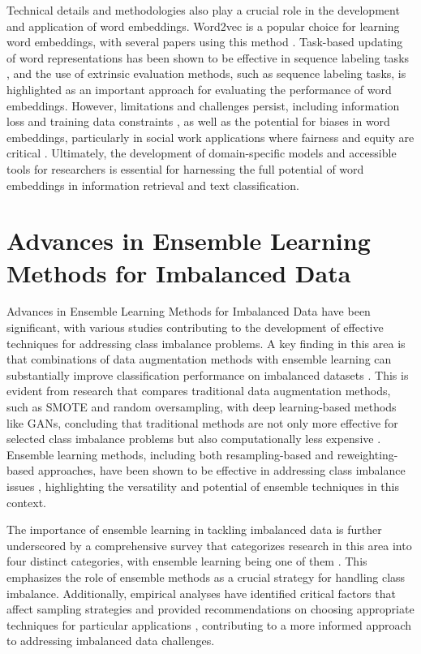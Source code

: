 \documentclass[conference]{IEEEtran}
\begin{document}
Technical details and methodologies also play a crucial role in the development and application of word embeddings. Word2vec is a popular choice for learning word embeddings, with several papers using this method \cite{towardWordEmbedding, utilityGeneralSpecific}. Task-based updating of word representations has been shown to be effective in sequence labeling tasks \cite{bigDataSmallData}, and the use of extrinsic evaluation methods, such as sequence labeling tasks, is highlighted as an important approach for evaluating the performance of word embeddings. However, limitations and challenges persist, including information loss and training data constraints \cite{primerWordEmbeddings}, as well as the potential for biases in word embeddings, particularly in social work applications where fairness and equity are critical \cite{primerWordEmbeddings}. Ultimately, the development of domain-specific models and accessible tools for researchers is essential for harnessing the full potential of word embeddings in information retrieval and text classification.

\section{Advances in Ensemble Learning Methods for Imbalanced Data}
Advances in Ensemble Learning Methods for Imbalanced Data have been significant, with various studies contributing to the development of effective techniques for addressing class imbalance problems. A key finding in this area is that combinations of data augmentation methods with ensemble learning can substantially improve classification performance on imbalanced datasets \cite{b1}. This is evident from research that compares traditional data augmentation methods, such as SMOTE and random oversampling, with deep learning-based methods like GANs, concluding that traditional methods are not only more effective for selected class imbalance problems but also computationally less expensive \cite{b1}. Ensemble learning methods, including both resampling-based and reweighting-based approaches, have been shown to be effective in addressing class imbalance issues \cite{b2, b3}, highlighting the versatility and potential of ensemble techniques in this context.

The importance of ensemble learning in tackling imbalanced data is further underscored by a comprehensive survey that categorizes research in this area into four distinct categories, with ensemble learning being one of them \cite{b4}. This emphasizes the role of ensemble methods as a crucial strategy for handling class imbalance. Additionally, empirical analyses have identified critical factors that affect sampling strategies and provided recommendations on choosing appropriate techniques for particular applications \cite{b5}, contributing to a more informed approach to addressing imbalanced data challenges.
\end{document}
